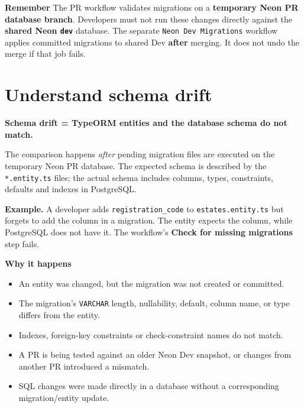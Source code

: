 \documentclass[10pt,a4paper]{article}
\begin{document}
\begin{tcolorbox}[colback=pale,colframe=lightborder,boxrule=.7pt,arc=2mm]
\textbf{Remember}\quad
The PR workflow validates migrations on a \textbf{temporary Neon PR database branch}. Developers must not run these changes directly against the \textbf{shared Neon \texttt{dev}} database. The separate \texttt{Neon Dev Migrations} workflow applies committed migrations to shared Dev \textbf{after} merging. It does not undo the merge if that job fails.
\end{tcolorbox}



\clearpage
\section*{Understand schema drift}
\begin{tcolorbox}[colback=pale,colframe=lightborder,boxrule=.7pt,arc=2mm]
\textbf{Schema drift = TypeORM entities and the database schema do not match.}

The comparison happens \emph{after} pending migration files are executed on the temporary Neon PR database. The expected schema is described by the \texttt{*.entity.ts} files; the actual schema includes columns, types, constraints, defaults and indexes in PostgreSQL.
\end{tcolorbox}

\textbf{Example.} A developer adds \texttt{registration\_code} to \texttt{estates.entity.ts} but forgets to add the column in a migration. The entity expects the column, while PostgreSQL does not have it. The workflow's \textbf{Check for missing migrations} step fails.

\textbf{Why it happens}
\begin{itemize}
  \item An entity was changed, but the migration was not created or committed.
  \item The migration's \texttt{VARCHAR} length, nullability, default, column name, or type differs from the entity.
  \item Indexes, foreign-key constraints or check-constraint names do not match.
  \item A PR is being tested against an older Neon Dev snapshot, or changes from another PR introduced a mismatch.
  \item SQL changes were made directly in a database without a corresponding migration/entity update.
\end{itemize}
\end{document}
